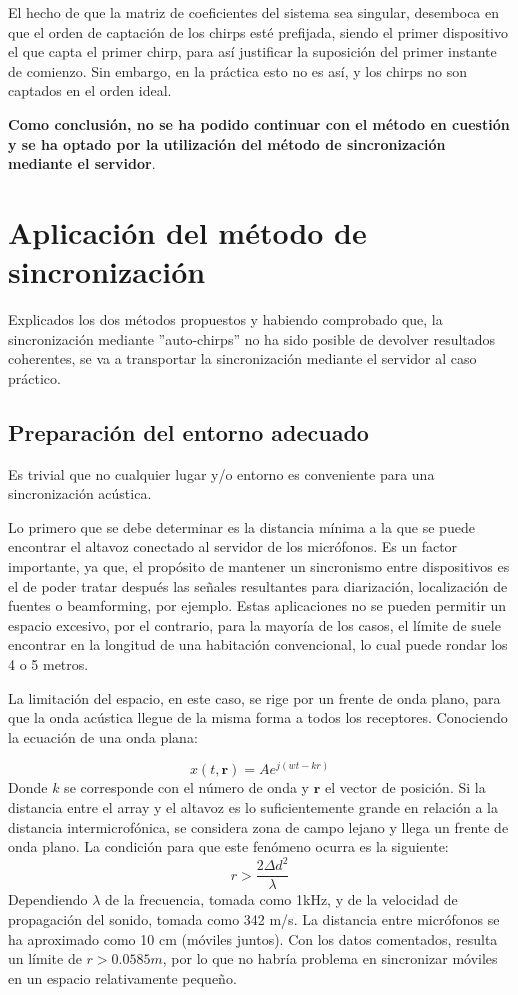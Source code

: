 \documentclass[a4paper,11pt]{book}
\begin{document}
El hecho de que la matriz de coeficientes del sistema sea singular, desemboca en que el orden de captación de los chirps esté prefijada, siendo el primer dispositivo el que capta el primer chirp, para así justificar la suposición del primer instante de comienzo. Sin embargo, en la práctica esto no es así, y los chirps no son captados en el orden ideal.

\textbf{Como conclusión, no se ha podido continuar con el método en cuestión y se ha optado por la utilización del método de sincronización mediante el servidor}.


\section{Aplicación del método de sincronización}

Explicados los dos métodos propuestos y habiendo comprobado que, la sincronización mediante ''auto-chirps'' no ha sido posible de devolver resultados coherentes, se va a transportar la sincronización mediante el servidor al caso práctico.

\subsection{Preparación del entorno adecuado}
Es trivial que no cualquier lugar y/o entorno es conveniente para una sincronización acústica.

 Lo primero que se debe determinar es la distancia mínima a la que se puede encontrar el altavoz conectado al servidor de los micrófonos. Es un factor importante, ya que, el propósito de mantener un sincronismo entre dispositivos es el de poder tratar después las señales resultantes para diarización, localización de fuentes o beamforming, por ejemplo. Estas aplicaciones no se pueden permitir un espacio excesivo, por el contrario, para la mayoría de los casos, el límite de suele encontrar en la longitud de una habitación convencional, lo cual puede rondar los 4 o 5 metros.

La limitación del espacio, en este caso, se rige por un frente de onda plano, para que la onda acústica llegue de la misma forma a todos los receptores. Conociendo la ecuación de una onda plana:

\begin{equation}
x(t, \textbf{r}) = Ae^{j(wt - kr)}
\end{equation}
Donde $k$ se corresponde con el número de onda y $\textbf{r}$ el vector de posición. Si la distancia entre el array y el altavoz es lo suficientemente grande en relación a la distancia intermicrofónica, se considera zona de campo lejano y llega un frente de onda plano. La condición para que este fenómeno ocurra es la siguiente:
\begin{equation}
r > \frac{2 \Delta d ^ {2}}{\lambda}
\end{equation}
Dependiendo $\lambda$ de la frecuencia, tomada como 1kHz, y de la velocidad de propagación del sonido, tomada como 342 m/s. La distancia entre micrófonos se ha aproximado como 10 cm (móviles juntos). Con los datos comentados, resulta un límite de $r > 0.0585 m$, por lo que no habría problema en sincronizar móviles en un espacio relativamente pequeño.
\end{document}
